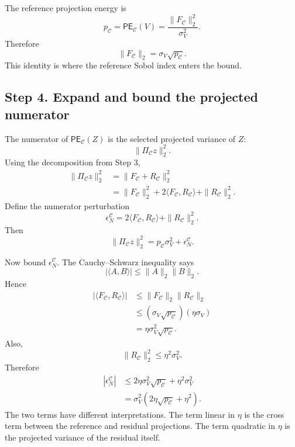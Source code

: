 \documentclass[11pt,letterpaper]{article}
\theoremstyle{remark}
\begin{document}
The reference projection energy is
\begin{equation}
  p_{\mathscr C}=\mathsf{PE}_{\mathscr C}(V)
  =\frac{\|F_{\mathscr C}\|_2^2}{\sigma_V^2}.
\end{equation}
Therefore
\begin{equation}
  \|F_{\mathscr C}\|_2=\sigma_V\sqrt{p_{\mathscr C}}.
\end{equation}
This identity is where the reference Sobol index enters the bound.

\subsection*{Step 4. Expand and bound the projected numerator}

The numerator of $\mathsf{PE}_{\mathscr C}(Z)$ is the selected projected variance
of $Z$:
\begin{equation}
  \|\Pi_{\mathscr C}z\|_2^2.
\end{equation}
Using the decomposition from Step 3,
\begin{align}
  \|\Pi_{\mathscr C}z\|_2^2
  &=\|F_{\mathscr C}+R_{\mathscr C}\|_2^2 \\
  &=\|F_{\mathscr C}\|_2^2
    +2\langle F_{\mathscr C},R_{\mathscr C}\rangle
    +\|R_{\mathscr C}\|_2^2.
\end{align}
Define the numerator perturbation
\begin{equation}
  \epsilon_N^{\mathscr C}
  =2\langle F_{\mathscr C},R_{\mathscr C}\rangle
   +\|R_{\mathscr C}\|_2^2.
\end{equation}
Then
\begin{equation}
  \|\Pi_{\mathscr C}z\|_2^2
  =p_{\mathscr C}\sigma_V^2+
  \epsilon_N^{\mathscr C}.
\end{equation}

Now bound $\epsilon_N^{\mathscr C}$. The Cauchy--Schwarz inequality says
\begin{equation}
  |\langle A,B\rangle|\leq\|A\|_2\|B\|_2.
\end{equation}
Hence
\begin{align}
  |\langle F_{\mathscr C},R_{\mathscr C}\rangle|
  &\leq \|F_{\mathscr C}\|_2\|R_{\mathscr C}\|_2 \\
  &\leq (\sigma_V\sqrt{p_{\mathscr C}})(\eta\sigma_V) \\
  &=\eta\sigma_V^2\sqrt{p_{\mathscr C}}.
\end{align}
Also,
\begin{equation}
  \|R_{\mathscr C}\|_2^2\leq\eta^2\sigma_V^2.
\end{equation}
Therefore
\begin{align}
  |\epsilon_N^{\mathscr C}|
  &\leq 2\eta\sigma_V^2\sqrt{p_{\mathscr C}}
       +\eta^2\sigma_V^2 \\
  &=\sigma_V^2(2\eta\sqrt{p_{\mathscr C}}+
       \eta^2).
  \label{eq:ped_general_epsN}
\end{align}
The two terms have different interpretations. The term linear in $\eta$ is the
cross term between the reference and residual projections. The term quadratic in
$\eta$ is the projected variance of the residual itself.
\end{document}
